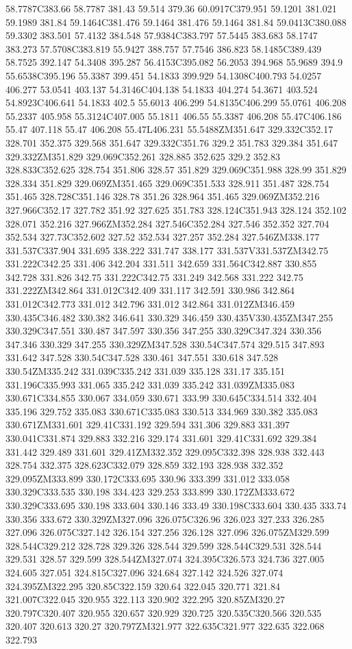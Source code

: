 58.7787C383.66 58.7787 381.43 59.514 379.36 60.0917C379.951 59.1201 381.021 59.1989 381.84 59.1464C381.476 59.1464 381.476 59.1464 381.84 59.0413C380.088 59.3302 383.501 57.4132 384.548 57.9384C383.797 57.5445 383.683 58.1747 383.273 57.5708C383.819 55.9427 388.757 57.7546 386.823 58.1485C389.439 58.7525 392.147 54.3408 395.287 56.4153C395.082 56.2053 394.968 55.9689 394.9 55.6538C395.196 55.3387 399.451 54.1833 399.929 54.1308C400.793 54.0257 406.277 53.0541 403.137 54.3146C404.138 54.1833 404.274 54.3671 403.524 54.8923C406.641 54.1833 402.5 55.6013 406.299 54.8135C406.299 55.0761 406.208 55.2337 405.958 55.3124C407.005 55.1811 406.55 55.3387 406.208 55.47C406.186 55.47 407.118 55.47 406.208 55.47L406.231 55.5488ZM351.647 329.332C352.17 328.701 352.375 329.568 351.647 329.332C351.76 329.2 351.783 329.384 351.647 329.332ZM351.829 329.069C352.261 328.885 352.625 329.2 352.83 328.833C352.625 328.754 351.806 328.57 351.829 329.069C351.988 328.99 351.829 328.334 351.829 329.069ZM351.465 329.069C351.533 328.911 351.487 328.754 351.465 328.728C351.146 328.78 351.26 328.964 351.465 329.069ZM352.216 327.966C352.17 327.782 351.92 327.625 351.783 328.124C351.943 328.124 352.102 328.071 352.216 327.966ZM352.284 327.546C352.284 327.546 352.352 327.704 352.534 327.73C352.602 327.52 352.534 327.257 352.284 327.546ZM338.177 331.537C337.904 331.695 338.222 331.747 338.177 331.537V331.537ZM342.75 331.222C342.25 331.406 342.204 331.511 342.659 331.564C342.887 330.855 342.728 331.826 342.75 331.222C342.75 331.249 342.568 331.222 342.75 331.222ZM342.864 331.012C342.409 331.117 342.591 330.986 342.864 331.012C342.773 331.012 342.796 331.012 342.864 331.012ZM346.459 330.435C346.482 330.382 346.641 330.329 346.459 330.435V330.435ZM347.255 330.329C347.551 330.487 347.597 330.356 347.255 330.329C347.324 330.356 347.346 330.329 347.255 330.329ZM347.528 330.54C347.574 329.515 347.893 331.642 347.528 330.54C347.528 330.461 347.551 330.618 347.528 330.54ZM335.242 331.039C335.242 331.039 335.128 331.17 335.151 331.196C335.993 331.065 335.242 331.039 335.242 331.039ZM335.083 330.671C334.855 330.067 334.059 330.671 333.99 330.645C334.514 332.404 335.196 329.752 335.083 330.671C335.083 330.513 334.969 330.382 335.083 330.671ZM331.601 329.41C331.192 329.594 331.306 329.883 331.397 330.041C331.874 329.883 332.216 329.174 331.601 329.41C331.692 329.384 331.442 329.489 331.601 329.41ZM332.352 329.095C332.398 328.938 332.443 328.754 332.375 328.623C332.079 328.859 332.193 328.938 332.352 329.095ZM333.899 330.172C333.695 330.96 333.399 331.012 333.058 330.329C333.535 330.198 334.423 329.253 333.899 330.172ZM333.672 330.329C333.695 330.198 333.604 330.146 333.49 330.198C333.604 330.435 333.74 330.356 333.672 330.329ZM327.096 326.075C326.96 326.023 327.233 326.285 327.096 326.075C327.142 326.154 327.256 326.128 327.096 326.075ZM329.599 328.544C329.212 328.728 329.326 328.544 329.599 328.544C329.531 328.544 329.531 328.57 329.599 328.544ZM327.074 324.395C326.573 324.736 327.005 324.605 327.051 324.815C327.096 324.684 327.142 324.526 327.074 324.395ZM322.295 320.85C322.159 320.64 322.045 320.771 321.84 321.007C322.045 320.955 322.113 320.902 322.295 320.85ZM320.27 320.797C320.407 320.955 320.657 320.929 320.725 320.535C320.566 320.535 320.407 320.613 320.27 320.797ZM321.977 322.635C321.977 322.635 322.068 322.793 